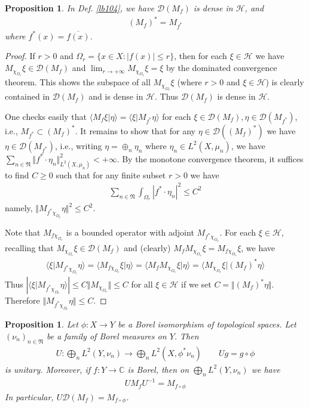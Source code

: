 \documentclass[12pt,b5paper,notitlepage]{article}
\theoremstyle{definition}
\theoremstyle{plain}
\newtheorem{pp}[df]{Proposition}
\newcommand{\fk}{\mathfrak}
\newcommand{\mc}{\mathcal}
\newcommand{\ovl}{\overline}
\newcommand{\Dom}{\scr D}
\newcommand{\bk}[1]{\langle {#1}\rangle}
\newcommand{\scr}{\mathscr}
\newcommand{\Cbb}{\mathbb C}
\numberwithin{equation}{section}
\begin{document}
\begin{pp}\label{lb105}
In Def. \ref{lb104}, we have $\Dom(M_f)$ is dense in $\mc H$, and
\begin{align*}
(M_f)^*=M_{f^*}
\end{align*}
where $f^*(x)=\ovl{f(x)}$.
\end{pp}



\begin{proof}
If $r>0$ and $\Omega_r=\{x\in X:|f(x)|\leq r\}$, then for each $\xi\in\mc H$ we have $M_{\chi_{\Omega_r}}\xi\in\Dom(M_f)$ and $\lim_{r\rightarrow+\infty}M_{\chi_{\Omega_r}}\xi=\xi$ by the dominated convergence theorem. This shows the subspace of all $M_{\chi_{\Omega_r}}\xi$ (where $r>0$ and $\xi\in\mc H$) is clearly contained in $\Dom(M_f)$ and is dense in $\mc H$. Thus $\Dom(M_f)$ is dense in $\mc H$.

One checks easily that $\bk{M_f\xi|\eta}=\bk{\xi|M_{f^*}\eta}$ for each $\xi\in\Dom(M_f),\eta\in\Dom(M_{f^*})$, i.e., $M_{f^*}\subset (M_f)^*$. It remains to show that for any $\eta\in\Dom((M_f)^*)$ we have $\eta\in \Dom(M_{f^*})$, i.e., writing $\eta=\oplus_n\eta_n$ where $\eta_n\in L^2(X,\mu_n)$, we have $\sum_{n\in\fk N}\Vert f^*\cdot\eta_n\Vert^2_{L^2(X,\mu_n)}<+\infty$. By the monotone convergence theorem, it suffices to find $C\geq0$ such that for any finite subset $r>0$ we have
\begin{align*}
\sum_{n\in\fk N}\int_{\Omega_r} |f^*\cdot\eta_n|^2\leq C^2
\end{align*}
namely, $\Vert M_{f^*\chi_{\Omega_r}}\eta\Vert^2\leq C^2$. 


Note that $M_{f\chi_{\Omega_r}}$ is a bounded operator with adjoint $M_{f^*\chi_{\Omega_r}}$. For each $\xi\in\mc H$, recalling that $M_{\chi_{\Omega_r}}\xi\in\Dom(M_f)$ and (clearly) $M_fM_{\chi_{\Omega_r}}\xi=M_{f\chi_{\Omega_r}}\xi$, we have
\begin{align*}
\bk{\xi|M_{f^*\chi_{\Omega_r}}\eta}=\bk{M_{f\chi_{\Omega_r}}\xi|\eta}=\bk{M_f M_{\chi_{\Omega_r}}\xi|\eta}=\bk{M_{\chi_{\Omega_r}}\xi|(M_f)^*\eta}
\end{align*}
Thus $|\bk{\xi|M_{f^*\chi_{\Omega_r}}\eta}|\leq C\Vert M_{\chi_{\Omega_r}}\Vert\leq C$ for all $\xi\in\mc H$ if we set $C=\Vert (M_f)^*\eta\Vert$. Therefore $\Vert M_{f^*\chi_{\Omega_r}}\eta\Vert\leq C$.
\end{proof}




\begin{pp}\label{lb70}
Let $\phi:X\rightarrow Y$ be a Borel isomorphism of topological spaces. Let $(\nu_n)_{n\in\fk N}$ be a family of Borel measures on $Y$. Then
\begin{gather*}
U:\bigoplus_nL^2(Y,\nu_n)\rightarrow \bigoplus_nL^2(X,\phi^*\nu_n)\qquad Ug=g\circ\phi
\end{gather*}
is unitary. Moreover, if $f:Y\rightarrow\Cbb$ is Borel, then on $\bigoplus_nL^2(Y,\nu_n)$ we have
\begin{align*}
UM_fU^{-1}=M_{f\circ\phi}
\end{align*}
In particular, $U\Dom(M_f)=M_{f\circ\phi}$.
\end{pp}
\end{document}
